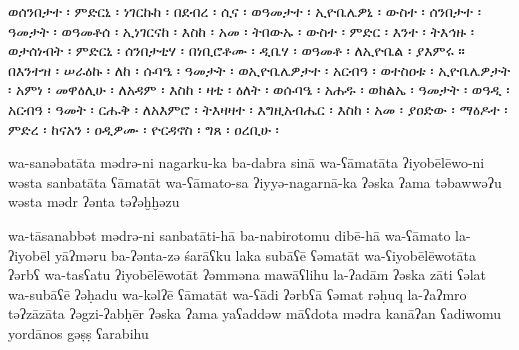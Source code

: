 
\begin{ethiopictext}
    ወሰንበታተ ፡ ምድርኒ ፡ ነገርኩከ ፡ በደብረ ፡ ሲና ፡ ወዓመታተ ፡
    ኢዮቤሌዎኒ ፡ ውስተ ፡ ሰንበታተ ፡ ዓመታት ፡ ወዓመቶሰ ፡ ኢነገርናከ ፡
    እስከ ፡ አመ ፡ ትበውኡ ፡ ውስተ ፡ ምድር ፡ እንተ ፡ ትእኅዙ ፡
    ወታሰነብት ፡ ምድርኒ ፡ ሰንበታቲሃ ፡ በነቢሮቶሙ ፡ ዲቤሃ ፡ 
    ወዓመቶ ፡ ለኢዮቤል ፡ ያእምሩ ። 
    በእንተዝ ፡ ሠራዕኩ ፡ ለከ ፡ 
    ሱባዔ ፡ ዓመታት ፡ ወኢዮቤሌዎታተ ፡ አርብዓ ፡ ወተስዐቱ ፡ ኢዮቤሌዎታት ፡
    አምነ ፡ መዋዕሊሁ ፡ ለአዳም ፡ እስከ ፡ ዛቲ ፡ ዕለት ፡ ወሱባዔ ፡
    አሐዱ ፡ ወክልኤ ፡ ዓመታት ፡ ወዓዲ ፡ አርብዓ ፡ ዓመት ፡ 
    ርሑቅ ፡ ለአእምሮ ፡ ትእዛዛተ ፡ እግዚአብሔር ፡ እስከ ፡ አመ ፡ ያዐድው ፡
    ማዕዶተ ፡ ምድረ ፡ ከናአን ፡ ዐዲዎሙ ፡ ዮርዳኖስ ፡ ግጸ ፡ ዐረቢሁ ፡
\end{ethiopictext}
\begin{transliteration}
    wa-sanəbatāta mədrə-ni nagarku-ka ba-dabra sinā wa-ʕāmatāta
    ʔiyobēlēwo-ni wəsta sanbatāta ʕāmatāt wa-ʕāmato-sa ʔiyyə-nagarnā-ka
    ʔəska ʔama təbawwəʔu wəsta mədr ʔənta təʔəḫḫəzu

    wa-tāsanabbət mədrə-ni sanbatāti-hā ba-nabirotomu dibē-hā
    wa-ʕāmato la-ʔiyobēl yāʔməru
    ba-ʔənta-zə śarāʕku laka
    subāʕē ʕəmatāt wa-ʕiyobēlēwotāta ʔərbʕ wa-tasʕatu ʔiyobēlēwotāt
    ʔəmməna mawāʕlihu la-ʔadām ʔəska zāti ʕəlat wa-subāʕē
    ʔəḥadu wa-kəlʔē ʕāmatāt wa-ʕādi ʔərbʕā ʕəmat
    rəḥuq la-ʔaʔmro təʔzāzāta ʔəgzi-ʔabḥēr ʔəska ʔama yaʕaddəw
    māʕdota mədra kanāʔan ʕadiwomu yordānos gəṣṣ ʕarabihu

\end{transliteration}

